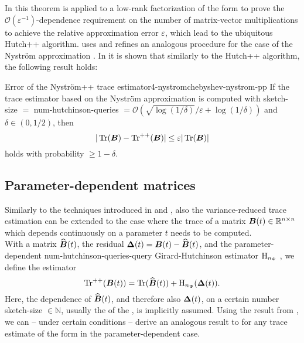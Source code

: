 In \cite{meyer2021hutch} this theorem is applied to a low-rank factorization of
the form  to prove the $\mathcal{O}(\varepsilon^{-1})$-dependence
requirement on the number of matrix-vector multiplications to achieve the relative
approximation error $\varepsilon$, which lead to the ubiquitous Hutch++ algorithm.
\cite{lin2017randomized} uses and \cite{persson2022hutch} refines an analogous procedure for the
case of the Nystr\"om approximation . In \cite[theorem~3.4]{persson2022hutch}
it is shown that similarly to the Hutch++ algorithm, the following result holds:
\begin{theorem}{Error of the Nystr\"om++ trace estimator}{4-nystromchebyshev-nystrom-pp}
    If the trace estimator  based
    on the Nystr\"om approximation  is computed
    with \gls{sketch-size} $=$ \gls{num-hutchinson-queries} $= \mathcal{O}(\sqrt{\log(1/\delta)}/\varepsilon + \log(1/\delta))$
    and $\delta \in (0, 1/2)$, then
    \begin{equation}
        |\operatorname{Tr}(\boldsymbol{B}) - \operatorname{Tr}^{++}(\boldsymbol{B})| \leq \varepsilon |\operatorname{Tr}(\boldsymbol{B})|
    \end{equation}
    holds with probability $\geq 1-\delta$.
\end{theorem}

\subsection{Parameter-dependent matrices}
\label{subsec:4-nystromchebyshev-reduction-parametrized-matrices}

Similarly to the techniques introduced in  and ,
also the variance-reduced trace estimation can be extended to the case where
the trace of a matrix $\boldsymbol{B}(t) \in \mathbb{R}^{n \times n}$ which depends continuously on a parameter $t$
needs to be computed.\\

With a matrix $\widehat{\boldsymbol{B}}(t)$, the residual $\boldsymbol{\Delta}(t) = \boldsymbol{B}(t) - \widehat{\boldsymbol{B}}(t)$,
and the parameter-dependent \gls{num-hutchinson-queries}-query Girard-Hutchinson estimator $\operatorname{H}_{n_{\Psi}}$
, we define the estimator 
\begin{equation}
    \operatorname{Tr}^{++}(\boldsymbol{B}(t)) = \operatorname{Tr}(\widehat{\boldsymbol{B}}(t)) + \operatorname{H}_{n_{\Psi}}(\boldsymbol{\Delta}(t)).
    \label{equ:4-nystromchebyshev-parameter-hutch-pp}
\end{equation}
Here, the dependence of $\widehat{\boldsymbol{B}}(t)$, and therefore also $\boldsymbol{\Delta}(t)$,
on a certain number \gls{sketch-size} $\in \mathbb{N}$, usually the 
of the , is implicitly assumed.
Using the result from ,
we can -- under certain conditions -- derive an analogous result
to  for any trace estimate of the form
 in the parameter-dependent case.

